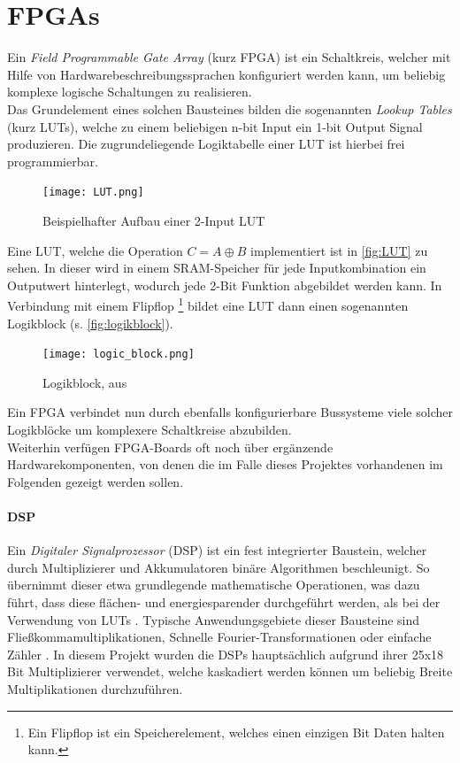 \documentclass[a4paper,12pt,onesided]{report}
\begin{document}
\section{FPGAs}
\label{sec:fpga}
Ein \textit{Field Programmable Gate Array} (kurz FPGA) ist ein Schaltkreis, welcher mit Hilfe von Hardwarebeschreibungssprachen %
konfiguriert werden kann, um beliebig komplexe logische Schaltungen zu realisieren.\\
Das Grundelement eines solchen Bausteines bilden die sogenannten \textit{Lookup Tables} (kurz LUTs), welche zu einem beliebigen n-bit Input ein 1-bit Output Signal produzieren. Die zugrundeliegende Logiktabelle einer LUT ist hierbei frei programmierbar.

\begin{figure}[H]
	\centering
	\texttt{[image: LUT.png]}
	\caption{Beispielhafter Aufbau einer 2-Input LUT}
	\label{fig:LUT}
\end{figure}

Eine LUT, welche die Operation $C = A \oplus B$ implementiert ist in \autoref{fig:LUT} zu sehen. In dieser wird in einem SRAM-Speicher für jede Inputkombination ein Outputwert hinterlegt, wodurch jede 2-Bit Funktion abgebildet werden kann. In Verbindung mit einem Flipflop \footnote{Ein Flipflop ist ein Speicherelement, welches einen einzigen Bit Daten halten kann.} bildet eine LUT dann einen sogenannten Logikblock (s. \autoref{fig:logikblock}).\cite{fpgaDesign}

\begin{figure}[H]
	\centering
	\texttt{[image: logic\_block.png]}
	\caption{Logikblock, aus \cite{fpgaDesign}}
	\label{fig:logikblock}
\end{figure}

Ein FPGA verbindet nun durch ebenfalls konfigurierbare Bussysteme viele solcher Logikblöcke um komplexere Schaltkreise abzubilden.\\
Weiterhin verfügen FPGA-Boards oft noch über ergänzende Hardwarekomponenten, von denen die im Falle dieses Projektes vorhandenen im Folgenden gezeigt werden sollen.

\paragraph{DSP}
Ein \textit{Digitaler Signalprozessor} (DSP) ist ein fest integrierter Baustein, welcher durch Multiplizierer und Akkumulatoren binäre Algorithmen beschleunigt.
So übernimmt dieser etwa grundlegende mathematische Operationen, was dazu führt, dass diese flächen- und energiesparender durchgeführt werden, als bei der Verwendung von LUTs \cite[S. 52]{dsps}.
Typische Anwendungsgebiete dieser Bausteine sind Fließkommamultiplikationen, Schnelle Fourier-Transformationen oder einfache Zähler \cite[S. 14]{dsps}. 
In diesem Projekt wurden die DSPs hauptsächlich aufgrund ihrer 25x18 Bit Multiplizierer verwendet, welche kaskadiert werden können um beliebig Breite Multiplikationen durchzuführen.
\end{document}
